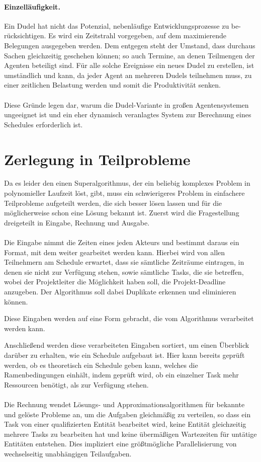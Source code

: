 \documentclass[12pt,twoside]{article}
\theoremstyle{plain}
\theoremstyle{definition}
\theoremstyle{remark}
\newcommand{\pbreak}{\paragraph*{}}
\begin{document}
\paragraph{Einzelläufigkeit.}
Ein Dudel hat nicht das Potenzial, nebenläufige Entwicklungsprozesse zu be-rücksichtigen.
Es wird ein Zeitstrahl vorgegeben, auf dem maximierende Belegungen ausgegeben werden.
Dem entgegen steht der Umstand, dass durchaus Sachen gleichzeitig geschehen können; so auch Termine, an denen Teilmengen der Agenten beteiligt sind.
Für alle solche Ereignisse ein neues Dudel zu erstellen, ist umständlich und kann, da jeder Agent an mehreren Dudels teilnehmen muss, zu einer zeitlichen Belastung werden und somit die Produktivität senken.
\pbreak
Diese Gründe legen dar, warum die Dudel-Variante in großen Agentensystemen ungeeignet ist und ein eher dynamisch veranlagtes System zur Berechnung eines Schedules erforderlich ist.

\section{Zerlegung in Teilprobleme}
Da es leider den einen Superalgorithmus, der ein beliebig komplexes Problem in polynomieller Laufzeit löst, gibt, muss ein schwierigeres Problem in einfachere Teilprobleme aufgeteilt werden, die sich besser lösen lassen und für die möglicherweise schon eine Lösung bekannt ist.
Zuerst wird die Fragestellung dreigeteilt in Eingabe, Rechnung und Ausgabe.
\pbreak
Die Eingabe nimmt die Zeiten eines jeden Akteurs und bestimmt daraus ein Format, mit dem weiter gearbeitet werden kann.
Hierbei wird von allen Teilnehmern am Schedule erwartet, dass sie sämtliche Zeiträume eintragen, in denen sie nicht zur Verfügung stehen, sowie sämtliche Tasks, die sie betreffen, wobei der Projektleiter die Möglichkeit haben soll, die Projekt-Deadline anzugeben.
Der Algorithmus soll dabei Duplikate erkennen und eliminieren können.

Diese Eingaben werden auf eine Form gebracht, die vom Algorithmus verarbeitet werden kann.

Anschließend werden diese verarbeiteten Eingaben sortiert, um einen Überblick darüber zu erhalten, wie ein Schedule aufgebaut ist.
Hier kann bereits geprüft werden, ob es theoretisch ein Schedule geben kann, welches die Ramenbedingungen einhält, indem geprüft wird, ob ein einzelner Task mehr Ressourcen benötigt, als zur Verfügung stehen.
\pbreak
Die Rechnung wendet Lösungs- und Approximationsalgorithmen für bekannte und gelöste Probleme an, um die Aufgaben gleichmäßig zu verteilen, so dass ein Task von einer qualifizierten Entität bearbeitet wird, keine Entität gleichzeitig mehrere Tasks zu bearbeiten hat und keine übermäßigen Wartezeiten für untätige Entitäten entstehen.
Dies impliziert eine größtmögliche Parallelisierung von wechselseitig unabhängigen Teilaufgaben.
\end{document}
